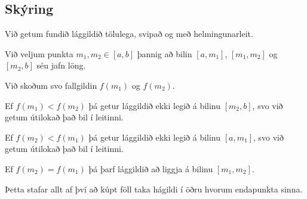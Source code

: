\subsection{Skýring}
{
    {
        \item<1-> Við getum fundið lággildið tölulega, svipað og með helmingunarleit.
        \item<2-> Við veljum punkta $m_1, m_2 \in [a, b]$ þannig að bilin $[a, m_1]$, $[m_1, m_2]$ og $[m_2, b]$ séu jafn löng.
        \item<3-> Við skoðum svo fallgildin $f(m_1)$ og $f(m_2)$.
        \item<4-> Ef $f(m_1) < f(m_2)$ þá getur lággildið ekki legið á bilinu $[m_2, b]$, svo við getum útilokað það bil í leitinni.
        \item<5-> Ef $f(m_2) < f(m_1)$ þá getur lággildið ekki legið á bilinu $[a, m_1]$, svo við getum útilokað það bil í leitinni.
        \item<6-> Ef $f(m_2) = f(m_1)$ þá þarf lággildið að liggja á bilinu $[m_1, m_2]$.
        \item<7-> Þetta stafar allt af því að kúpt föll taka hágildi í öðru hvorum endapunkta sinna.
    }
}

